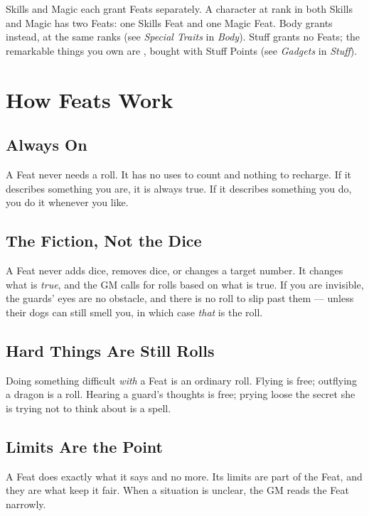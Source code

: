 Skills and Magic each grant Feats separately. A character at rank
 in both Skills and Magic has two Feats: one Skills Feat and
one Magic Feat. Body grants  instead, at the
same ranks (see \emph{Special Traits} in \emph{Body}). Stuff grants no
Feats; the remarkable things you own are , bought with
Stuff Points (see \emph{Gadgets} in \emph{Stuff}).

\section{How Feats Work}

\subsection*{Always On}
A Feat never needs a roll. It has no uses to count and nothing to
recharge. If it describes something you are, it is always true. If it
describes something you do, you do it whenever you like.

\subsection*{The Fiction, Not the Dice}
A Feat never adds dice, removes dice, or changes a target number. It
changes what is \emph{true}, and the GM calls for rolls based on what is
true. If you are invisible, the guards' eyes are no obstacle, and there
is no roll to slip past them --- unless their dogs can still smell you,
in which case \emph{that} is the roll.

\subsection*{Hard Things Are Still Rolls}
Doing something difficult \emph{with} a Feat is an ordinary roll.
Flying is free; outflying a dragon is a  roll. Hearing a
guard's thoughts is free; prying loose the secret she is trying not to
think about is a spell.

\subsection*{Limits Are the Point}
A Feat does exactly what it says and no more. Its limits are part of
the Feat, and they are what keep it fair. When a situation is unclear,
the GM reads the Feat narrowly.

